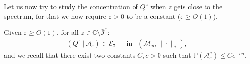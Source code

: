 \documentclass{ws-rmta}
\DeclareMathOperator{\tr}{Tr}
\begin{document}
Let us now try to study the concentration of $Q^z$ when $z$ gets close to the spectrum, for that we now require $\varepsilon>0$ to be a constant ($\varepsilon \geq O(1)$).
\begin{proposition}\label{pro:Concentration_lineaire_Q_proche_spectre}
  Given $\varepsilon \geq O(1)$, for all $z \in \mathbb C \setminus \bar{\mathcal S}^ \varepsilon$:
  \begin{align*}
    (Q^z \ | \ \mathcal A_\varepsilon) \in \mathcal E_2&
    &\text{in } \ \ (\mathcal{M}_{p}, \|\cdot \|_*),
  \end{align*}
  and we recall that there exist two constants $C,c>0$ such that $ \mathbb P \left( \mathcal A_\varepsilon^c \right)  \leq C e^{-cn}$.
\end{proposition}
\end{document}
